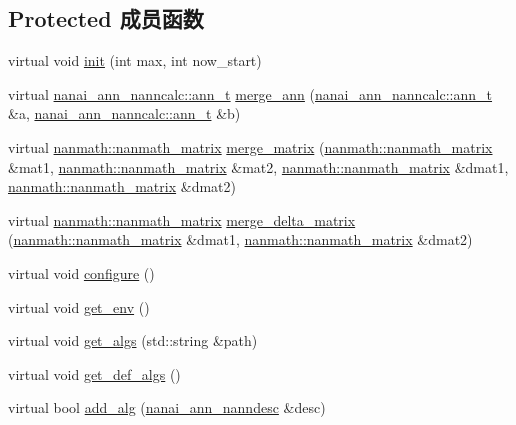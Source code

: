 \subsection*{Protected 成员函数}
\begin{DoxyCompactItemize}
\item 
virtual void \hyperlink{classnanai_1_1nanai__ann__nannmgr_ae4bd257f8c13617deb792e90f72574ea}{init} (int max, int now\+\_\+start)
\item 
virtual \hyperlink{classnanai_1_1nanai__ann__nanncalc_1_1ann__t}{nanai\+\_\+ann\+\_\+nanncalc\+::ann\+\_\+t} \hyperlink{classnanai_1_1nanai__ann__nannmgr_a569b5527d3efd6615b1ed5fe311d3e55}{merge\+\_\+ann} (\hyperlink{classnanai_1_1nanai__ann__nanncalc_1_1ann__t}{nanai\+\_\+ann\+\_\+nanncalc\+::ann\+\_\+t} \&a, \hyperlink{classnanai_1_1nanai__ann__nanncalc_1_1ann__t}{nanai\+\_\+ann\+\_\+nanncalc\+::ann\+\_\+t} \&b)
\item 
virtual \hyperlink{classnanmath_1_1nanmath__matrix}{nanmath\+::nanmath\+\_\+matrix} \hyperlink{classnanai_1_1nanai__ann__nannmgr_a7a9f384ebe727ed9722cbc04e82d30c8}{merge\+\_\+matrix} (\hyperlink{classnanmath_1_1nanmath__matrix}{nanmath\+::nanmath\+\_\+matrix} \&mat1, \hyperlink{classnanmath_1_1nanmath__matrix}{nanmath\+::nanmath\+\_\+matrix} \&mat2, \hyperlink{classnanmath_1_1nanmath__matrix}{nanmath\+::nanmath\+\_\+matrix} \&dmat1, \hyperlink{classnanmath_1_1nanmath__matrix}{nanmath\+::nanmath\+\_\+matrix} \&dmat2)
\item 
virtual \hyperlink{classnanmath_1_1nanmath__matrix}{nanmath\+::nanmath\+\_\+matrix} \hyperlink{classnanai_1_1nanai__ann__nannmgr_a1d9acf82974a0c785349370f40d583af}{merge\+\_\+delta\+\_\+matrix} (\hyperlink{classnanmath_1_1nanmath__matrix}{nanmath\+::nanmath\+\_\+matrix} \&dmat1, \hyperlink{classnanmath_1_1nanmath__matrix}{nanmath\+::nanmath\+\_\+matrix} \&dmat2)
\item 
virtual void \hyperlink{classnanai_1_1nanai__ann__nannmgr_a4097cd6c0d8c9fbd38df08d4474162d7}{configure} ()
\item 
virtual void \hyperlink{classnanai_1_1nanai__ann__nannmgr_a910e51066acc0cefa5a13d441080020a}{get\+\_\+env} ()
\item 
virtual void \hyperlink{classnanai_1_1nanai__ann__nannmgr_af20462056d6628462b18b865197083a5}{get\+\_\+algs} (std\+::string \&path)
\item 
virtual void \hyperlink{classnanai_1_1nanai__ann__nannmgr_a2041f91a11e801557c4e2a310fae4355}{get\+\_\+def\+\_\+algs} ()
\item 
virtual bool \hyperlink{classnanai_1_1nanai__ann__nannmgr_aaf4b292087f8f3f48f6a77140dd512ca}{add\+\_\+alg} (\hyperlink{namespacenanai_a892a8c80381d0005a076b68fbbf2d918}{nanai\+\_\+ann\+\_\+nanndesc} \&desc)

\end{DoxyCompactItemize}
